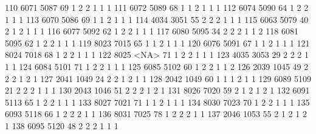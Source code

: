 \documentclass[
  letterpaper,
  DIV=11,
  numbers=noendperiod]{scrreprt}
\newenvironment{Shaded}{\begin{snugshade}}{\end{snugshade}}
\newcommand{\NormalTok}[1]{\textcolor[rgb]{0.00,0.23,0.31}{#1}}
\begin{document}
\begin{Shaded}
\begin{Highlighting}[]
\NormalTok{110 6071 5087  69          1      2        2         1    1                 1}
\NormalTok{111 6072 5089  68          1      1        2         1    1                 1}
\NormalTok{112 6074 5090  64          1      2        2         1    1                 1}
\NormalTok{113 6070 5086  69          1      1        2         1    1                 1}
\NormalTok{114 4034 3051  55          2      2        2         1    1                 1}
\NormalTok{115 6063 5079  40          2      1        2         1    1                 1}
\NormalTok{116 6077 5092  62          1      2        2         1    1                 1}
\NormalTok{117 6080 5095  34          2      2        2         1    1                 2}
\NormalTok{118 6081 5095  62          1      2        2         1    1                 1}
\NormalTok{119 8023 7015  65          1      1        2         1    1                 1}
\NormalTok{120 6076 5091  67          1      1        2         1    1                 1}
\NormalTok{121 8024 7018  68          1      2        2         1    1                 1}
\NormalTok{122 8025 \textless{}NA\textgreater{}  71          1      2        2         1    1                 1}
\NormalTok{123 4035 3053  29          2      2        2         1    1                 1}
\NormalTok{124 6084 5101  71          1      2        2         1    1                 1}
\NormalTok{125 6085 5102  60          1      2        2         1    1                 2}
\NormalTok{126 2039 1045  49          2      2        2         1    2                 1}
\NormalTok{127 2041 1049  24          2      2        1         2    1                 1}
\NormalTok{128 2042 1049  60          1      1        1         2    1                 1}
\NormalTok{129 6089 5109  21          2      2        2         1    1                 1}
\NormalTok{130 2043 1046  51          2      2        2         1    2                 1}
\NormalTok{131 8026 7020  59          2      1        2         1    2                 1}
\NormalTok{132 6091 5113  65          1      2        2         1    1                 1}
\NormalTok{133 8027 7021  71          1      1        2         1    1                 1}
\NormalTok{134 8030 7023  70          1      2        2         1    1                 1}
\NormalTok{135 6093 5118  66          1      2        2         2    1                 1}
\NormalTok{136 8031 7025  78          1      2        2         2    1                 1}
\NormalTok{137 2046 1053  55          2      1        2         1    2                 1}
\NormalTok{138 6095 5120  48          2      2        2         1    1                 1}

\end{Highlighting}
\end{Shaded}
\end{document}
